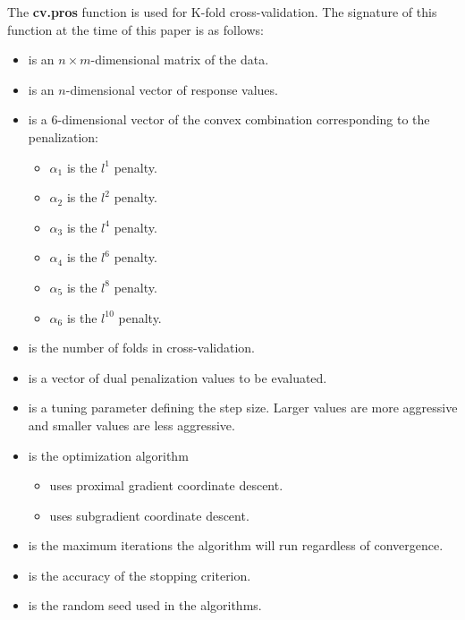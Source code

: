 \documentclass[article]{jss}
\numberwithin{equation}{section}
\begin{document}
The \textbf{cv.pros} function is used for K-fold cross-validation.
The signature of this function at the time of this paper is as follows:

\begin{itemize}
\item {} is an $n \times m$-dimensional matrix of the data.

\item {} is an $n$-dimensional vector of response values.

\item {} is a $6$-dimensional vector of the convex combination corresponding to the penalization:
 \begin{itemize}
   \item $\alpha_1$ is the $l^1$ penalty.
   \item $\alpha_2$ is the $l^2$ penalty.
   \item $\alpha_3$ is the $l^4$ penalty.
   \item $\alpha_4$ is the $l^6$ penalty.
   \item $\alpha_5$ is the $l^8$ penalty.
   \item $\alpha_6$ is the $l^{10}$ penalty.
\end{itemize}

\item {} is the number of folds in cross-validation.

\item {} is a vector of dual penalization values to be evaluated.

\item {} is a tuning parameter defining the step size. Larger values are more aggressive and smaller values are less aggressive.

\item {} is the optimization algorithm
\begin{itemize}
\item {} uses proximal gradient coordinate descent.
\item {} uses subgradient coordinate descent.
\end{itemize}

\item {} is the maximum iterations the algorithm will run regardless of convergence.

\item {} is the accuracy of the stopping criterion.

\item {} is the random seed used in the algorithms.

\end{itemize}
\end{document}
